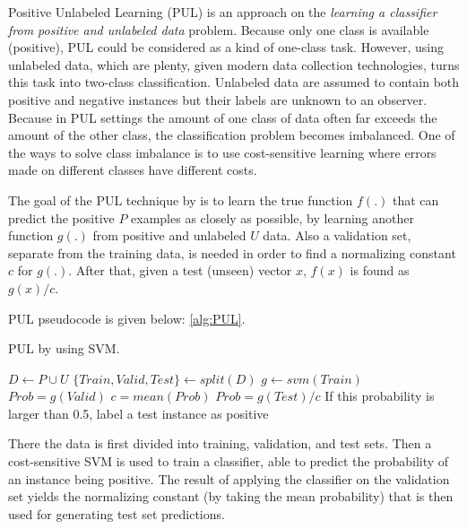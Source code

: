 Positive Unlabeled Learning (PUL) is an approach on the \textit{learning a classifier from positive and unlabeled data} problem. Because only one class is available (positive), PUL could be considered as a kind of one-class task. However, using unlabeled data, which are plenty, given modern data collection technologies, turns this task into two-class classification. Unlabeled data are assumed to contain both positive and negative instances but their labels are unknown to an observer. Because in PUL settings the amount of one class of data often far exceeds the amount of the other class, the classification problem becomes imbalanced. One of the ways to solve class imbalance is to use cost-sensitive learning where errors made on different classes have different costs.

The goal of the PUL technique by \cite{Elkan;Noto:2008} is to learn the true function \(f(.)\) that can predict the positive \(P\) examples as closely as possible, by learning another function \(g(.)\) from positive and unlabeled \(U\) data. Also a validation set, separate from the training data, is needed in order to find a normalizing constant \(c\) for \(g(.)\). After that, given a test (unseen) vector \(x\), \(f(x)\) is found as \(g(x)/c\).

PUL pseudocode is given below: \ref{alg:PUL}. 

\begin{algorithm}[h!]                      
\caption{PUL by using SVM.} 
\label{alg:PUL}                          
    \begin{algorithmic}[1]
        \State $ D\gets P \cup U$ 
        \State $\{Train,Valid,Test\}\gets split(D)$ 
        \State $g \gets svm(Train)$ 
        \State $Prob = g(Valid)$ 
        \State $c = mean(Prob)$  
        \State $Prob = g(Test) / c$ 
        \State If this probability is larger than 0.5, label a test instance as positive
   \end{algorithmic}
\end{algorithm}

There the data is first divided into training, validation, and test sets. Then a cost-sensitive SVM is used to train a classifier, able to predict the probability of an instance being positive. The result of applying the classifier on the validation set yields the normalizing constant (by taking the mean probability) that is then used for generating test set predictions.

